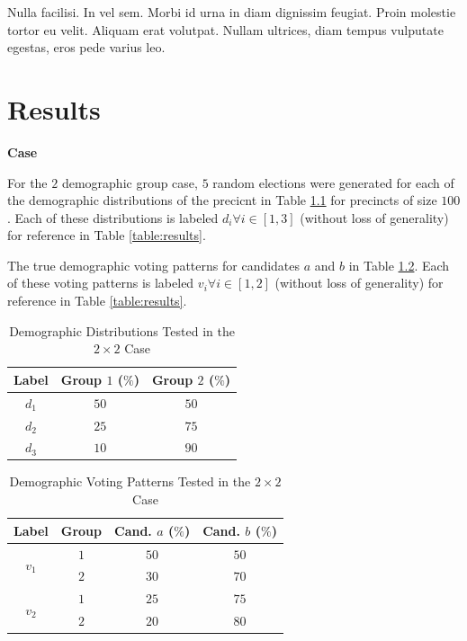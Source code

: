 \begin{savequote}[75mm]
Nulla facilisi. In vel sem. Morbi id urna in diam dignissim feugiat. Proin molestie tortor eu velit. Aliquam erat volutpat. Nullam ultrices, diam tempus vulputate egestas, eros pede varius leo.
\end{savequote}

\chapter{Results}
\label{chap:results}


 \textbf{Case}

For the $2$ demographic group case, $5$ random elections were generated for each of the demographic distributions of the precicnt in Table \ref{table:demo_dist} for precincts of size $100$. Each of these distributions is labeled $d_i \forall i \in [1, 3]$ (without loss of generality) for reference in Table \ref{table:results}.

The true demographic voting patterns for candidates $a$ and $b$ in Table \ref{table:voting}. Each of these voting patterns is labeled $v_i \forall i \in [1, 2]$ (without loss of generality) for reference in Table \ref{table:results}.

\begin{table}[ht]
 \centering
 \caption{Demographic Distributions Tested in the $2 \times 2$ Case}
 \label{table:demo_dist}
 \begin{tabular}{|c|c|c|}
   \hline
   Label & Group $1$ ($\%$) & Group $2$ ($\%$) \\
   \hline
   $d_1$ & $50$ & $50$ \\
   $d_2$ & $25$ & $75$ \\
   $d_3$ & $10$ & $90$ \\
  \hline
 \end{tabular}
\end{table}

\begin{table}[ht]
 \centering
 \caption{Demographic Voting Patterns Tested in the $2 \times 2$ Case}
 \label{table:voting}
 \begin{tabular}{|c|c|c|c|}
   \hline
   Label & Group & Cand. $a$ ($\%$) & Cand. $b$ ($\%$) \\
   \hline
   \multirow{2}{*}{$v_1$} & $1$ & $50$ & $50$ \\
   & $2$ & $30$ & $70$ \\
   \hline
   \multirow{2}{*}{$v_2$} & $1$ & $25$ & $75$ \\
   & $2$ & $20$ & $80$ \\
  \hline
 \end{tabular}
\end{table}

